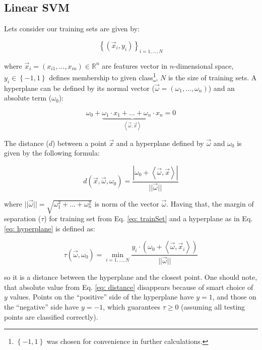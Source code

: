 \subsection{Linear SVM}
\label{fig: svmLinear}

Lets consider our training sets are given by:

\begin{equation}
  \left\{\left(\vec x_i, y_i\right)\right\}_{i=1,...,N}
  \label{eq: trainSet}
\end{equation}

where $\vec x_i = \left(x_{i1}, ... , x_{in}\right) \in \mathbb{R}^n$ are features vector in $n$-dimensional space, $y_i \in \left\{-1, 1\right\}$ defines membership to given class\footnote{$\left\{-1, 1\right\}$ was chosen for convenience in further calculations.}, $N$ is the size of training sets. A hyperplane can be defined by its normal vector ($\vec\omega = (\omega_1, ... , \omega_n)$) and an absolute term ($\omega_0$):

\begin{equation}
 \omega_0 + \underbrace{\omega_1 \cdot x_1 + ... + \omega_n\cdot x_n}_{\left<\vec\omega, \vec x\right>} = 0
 \label{eq: hyperplane}
\end{equation}

The distance ($d$) between a point $\vec x$ and a hyperplane defined by $\vec\omega$ and $\omega_0$ is given by the following formula:

\begin{equation}
 d \left(\vec x, \vec\omega, \omega_0\right) = \frac{\left|\omega_0 + \left<\vec\omega, \vec x\right>\right|}{||\vec\omega||}
 \label{eq: distance}
\end{equation}

where $||\vec\omega|| = \sqrt{\omega_1^2 + ... + \omega_n^2}$ is norm of the vector $\vec\omega$. Having that, the margin of separation ($\tau$) for training set from Eq. \ref{eq: trainSet} and a hyperplane as in Eq. \ref{eq: hyperplane} is defined as:

\begin{equation}
 \tau (\vec\omega, \omega_0) = \min_{i=1,...,N} \frac{y_i\cdot\left(\omega_0 + \left<\vec\omega, \vec x_i\right>\right)}{||\vec\omega||}
\end{equation}

so it is a distance between the hyperplane and the closest point. One should note, that absolute value from Eq. \ref{eq: distance} disappears because of smart choice of $y$ values. Points on the ``positive'' side of the hyperplane have $y = 1$, and those on the ``negative'' side have $y = -1$, which guarantees $\tau \geq 0$ (assuming all testing points are classified correctly).

